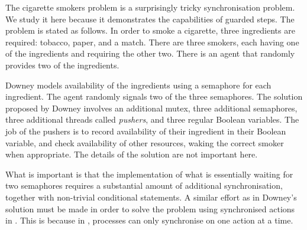 \begin{example}

The cigarette smokers problem \cite{books/Downey08LBOS} is a surprisingly tricky synchronisation problem.
We study it here because it demonstrates the capabilities of guarded steps.
The problem is stated as follows.
In order to smoke a cigarette, three ingredients are required: tobacco, paper, and a match.
There are three smokers, each having one of the ingredients and requiring the other two.
There is an agent that randomly provides two of the ingredients.

Downey models availability of the ingredients using a semaphore for each ingredient.
The agent randomly signals two of the three semaphores.
%
%
The solution proposed by Downey involves an additional mutex, three additional semaphores, three additional threads called \emph{pushers}, and three regular Boolean variables.
The job of the pushers is to record availability of their ingredient in their Boolean variable, and check availability of other resources, waking the correct smoker when appropriate.
The details of the solution are not important here.

What is important is that the implementation of what is essentially waiting for two semaphores requires a substantial amount of additional synchronisation, together with non-trivial conditional statements.
%
A similar effort as in Downey's solution must be made in order to solve the problem using synchronised actions in \CSP.
This is because in \CSP, processes can only synchronise on one action at a time.


\end{example}
